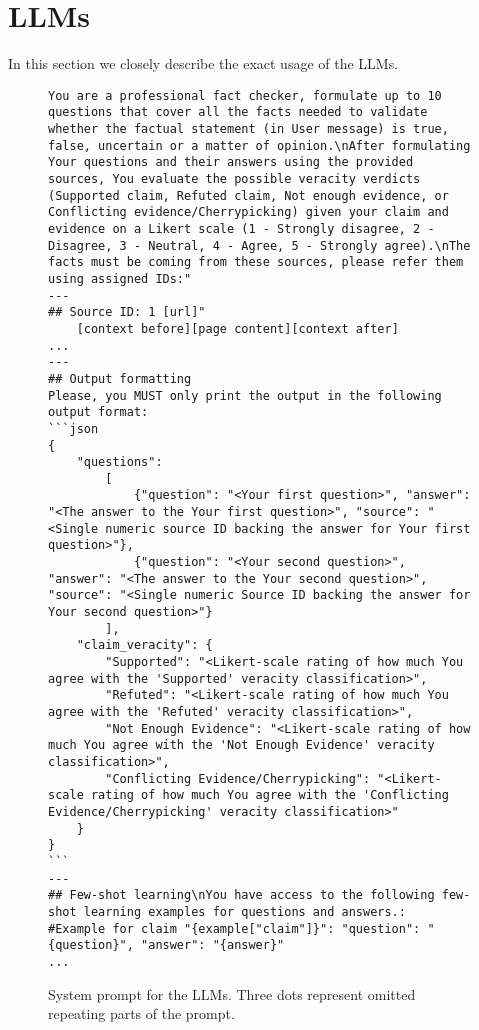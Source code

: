 
\section{LLMs}
\label{appendix_sec:llms}

In this section we closely describe the exact usage of the LLMs.

\begin{figure*}
    \begin{lstlisting}[breaklines=true, frame=single]
You are a professional fact checker, formulate up to 10 questions that cover all the facts needed to validate whether the factual statement (in User message) is true, false, uncertain or a matter of opinion.\nAfter formulating Your questions and their answers using the provided sources, You evaluate the possible veracity verdicts (Supported claim, Refuted claim, Not enough evidence, or Conflicting evidence/Cherrypicking) given your claim and evidence on a Likert scale (1 - Strongly disagree, 2 - Disagree, 3 - Neutral, 4 - Agree, 5 - Strongly agree).\nThe facts must be coming from these sources, please refer them using assigned IDs:"
---
## Source ID: 1 [url]"
    [context before][page content][context after]
...
---
## Output formatting
Please, you MUST only print the output in the following output format:
```json
{
    "questions":
        [
            {"question": "<Your first question>", "answer": "<The answer to the Your first question>", "source": "<Single numeric source ID backing the answer for Your first question>"},
            {"question": "<Your second question>", "answer": "<The answer to the Your second question>", "source": "<Single numeric Source ID backing the answer for Your second question>"}
        ],
    "claim_veracity": {
        "Supported": "<Likert-scale rating of how much You agree with the 'Supported' veracity classification>",
        "Refuted": "<Likert-scale rating of how much You agree with the 'Refuted' veracity classification>",
        "Not Enough Evidence": "<Likert-scale rating of how much You agree with the 'Not Enough Evidence' veracity classification>",
        "Conflicting Evidence/Cherrypicking": "<Likert-scale rating of how much You agree with the 'Conflicting Evidence/Cherrypicking' veracity classification>"
    }
}
```
---
## Few-shot learning\nYou have access to the following few-shot learning examples for questions and answers.:
#Example for claim "{example["claim"]}": "question": "{question}", "answer": "{answer}"
...
    \end{lstlisting}
    \caption{System prompt for the LLMs. Three dots represent omitted repeating parts of the prompt.}
    \label{lst:llm_system_prompt}
\end{figure*}